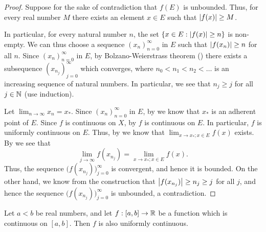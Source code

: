 \begin{proof}
  Suppose for the sake of contradiction that \(f(E)\) is unbounded.
  Thus, for every real number \(M\) there exists an element \(x \in E\) such that \(\left\lvert f(x)\right\rvert \geq M\).

  In particular, for every natural number \(n\), the set \(\left\lbrace x \in E : \left\lvert f(x)\right\rvert \geq n\right\rbrace\) is non-empty.
  We can thus choose a sequence \((x_n)_{n = 0}^\infty\) in \(E\) such that \(\left\lvert f(x_n)\right\rvert \geq n\) for all \(n\).
  Since \((x_n)_{n = 0}^\infty\) in \(E\), by Bolzano-Weierstrass theorem () there exists a subsequence \((x_{n_j})_{j = 0}^\infty\) which converges, where \(n_0 < n_1 < n_2 < \dots\) is an increasing sequence of natural numbers.
  In particular, we see that \(n_j \geq j\) for all \(j \in \mathbb{N}\) (use induction).

  Let \(\lim_{n \to \infty} x_n = x_*\).
  Since \((x_n)_{n = 0}^\infty\) in \(E\), by  we know that \(x_*\) is an adherent point of \(E\).
  Since \(f\) is continuous on \(X\), by  \(f\) is continuous on \(E\).
  In particular, \(f\) is uniformly continuous on \(E\).
  Thus, by  we know that \(\lim_{x \to x_* ; x \in E} f(x)\) exists.
  By  we see that
  \[
    \lim_{j \to \infty} f(x_{n_j}) = \lim_{x \to x_* ; x \in E} f(x).
  \]
  Thus, the sequence \(\big(f(x_{n_j})\big)_{j = 0}^\infty\) is convergent, and hence it is bounded.
  On the other hand, we know from the construction that \(\left\lvert f(x_{n_j})\right\rvert \geq n_j \geq j\) for all \(j\), and hence the sequence \(\big(f(x_{n_j})\big)_{j = 0}^\infty\) is unbounded, a contradiction.
\end{proof}

\begin{thm}\label{i:9.9.16}
  Let \(a < b\) be real numbers, and let \(f : [a, b] \to \mathbb{R}\) be a function which is continuous on \([a, b]\).
  Then \(f\) is also uniformly continuous.
\end{thm}

